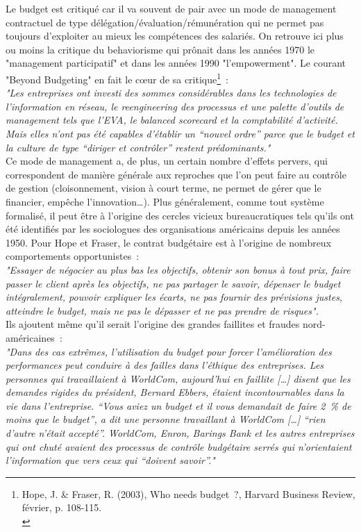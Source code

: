 \documentclass{kaobook}
\begin{document}
Le budget est critiqué car il va souvent de pair avec un mode de management contractuel de type délégation/évaluation/rémunération qui ne permet pas toujours d'exploiter au mieux les compétences des salariés. On retrouve ici plus ou moins la critique du behaviorisme qui prônait dans les années 1970 le "management participatif" et dans les années 1990 "l'empowerment". Le courant "Beyond Budgeting" en fait le cœur de sa critique\footnote{Hope, J. \& Fraser, R. (2003), Who needs budget ?, Harvard Business Review, février, p. 108-115.\\} :\\
\emph{"Les entreprises ont investi des sommes considérables dans les technologies de l'information en réseau, le reengineering des processus et une palette d'outils de management tels que l'EVA, le balanced scorecard et la comptabilité d'activité. Mais elles n'ont pas été capables d'établir un “nouvel ordre” parce que le budget et la culture de type “diriger et contrôler” restent prédominants."}\\

Ce mode de management a, de plus, un certain nombre d'effets pervers, qui correspondent de manière générale aux reproches que l'on peut faire au contrôle de gestion (cloisonnement, vision à court terme, ne permet de gérer que le financier, empêche l'innovation\ldots{}). Plus généralement, comme tout système formalisé, il peut être à l'origine des cercles vicieux bureaucratiques tels qu'ils ont été identifiés par les sociologues des organisations américains depuis les années 1950. Pour Hope et Fraser, le contrat budgétaire est à l'origine de nombreux comportements opportunistes :\\
\emph{"Essayer de négocier au plus bas les objectifs, obtenir son bonus à tout prix, faire passer le client après les objectifs, ne pas partager le savoir, dépenser le budget intégralement, pouvoir expliquer les écarts, ne pas fournir des prévisions justes, atteindre le budget, mais ne pas le dépasser et ne pas prendre de risques".}\\
Ils ajoutent même qu'il serait l'origine des grandes faillites et fraudes nord-américaines :\\
\emph{"Dans des cas extrêmes, l'utilisation du budget pour forcer l'amélioration des performances peut conduire à des failles dans l'éthique des entreprises. Les personnes qui travaillaient à WorldCom, aujourd'hui en faillite [\ldots{}] disent que les demandes rigides du président, Bernard Ebbers, étaient incontournables dans la vie dans l'entreprise. “Vous aviez un budget et il vous demandait de faire 2 \% de moins que le budget”, a dit une personne travaillant à WorldCom [\ldots{}] “rien d'autre n'était accepté”. WorldCom, Enron, Barings Bank et les autres entreprises qui ont chuté avaient des processus de contrôle budgétaire serrés qui n'orientaient l'information que vers ceux qui “doivent savoir”."}\\
\end{document}
